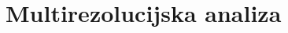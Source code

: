\documentclass[main.tex]{subfiles}
\begin{document}
\section{Multirezolucijska analiza}\label{sec:mra}
\end{document}
